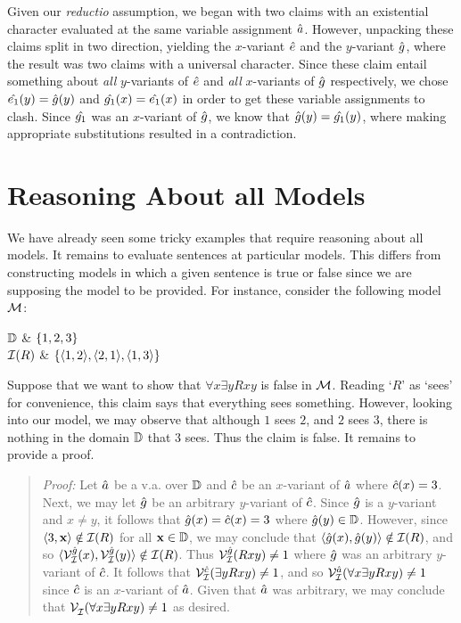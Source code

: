 Given our \textit{reductio} assumption, we began with two claims with an existential character evaluated at the same variable assignment $\hat{a}$.
However, unpacking these claims split in two direction, yielding the $x$-variant $\hat{e}$ and the $y$-variant $\hat{g}$, where the result was two claims with a universal character.
Since these claim entail something about \textit{all} $y$-variants of $\hat{e}$ and \textit{all} $x$-variants of $\hat{g}$ respectively, we chose $\hat{e_1}(y)=\hat{g}(y)$ and $\hat{g_1}(x)=\hat{e_1}(x)$ in order to get these variable assignments to clash. 
Since $\hat{g_1}$ was an $x$-variant of $\hat{g}$, we know that $\hat{g}(y)=\hat{g_1}(y)$, where making appropriate substitutions resulted in a contradiction.





\section{Reasoning About all Models}
  \label{sec.somemodelreasoning}

We have already seen some tricky examples that require reasoning about all models.
It remains to evaluate sentences at particular models.
This differs from constructing models in which a given sentence is true or false since we are supposing the model to be provided.
For instance, consider the following model $\mathcal{M}$:

\begin{partialmodel}
	$\mathbb{D}$			& $\lbrace1,2,3\rbrace$ \\
	$\mathcal{I}(R)$	  & $\lbrace\langle1,2\rangle,\langle2,1\rangle,\langle1,3\rangle\rbrace$ \\
\end{partialmodel}

Suppose that we want to show that $\forall x\exists y Rxy$ is false in $\mathcal{M}$.
Reading `$R$' as `sees' for convenience, this claim says that everything sees something.
However, looking into our model, we may observe that although $1$ sees $2$, and $2$ sees $3$, there is nothing in the domain $\mathbb{D}$ that $3$ sees.
Thus the claim is false.
It remains to provide a proof.

\begin{quote}
\label{somemodel1}
  \textit{Proof:}
  Let $\hat{a}$ be a v.a. over $\mathbb{D}$ and $\hat{c}$ be an $x$-variant of $\hat{a}$ where $\hat{c}(x)=3$.
  Next, we may let $\hat{g}$ be an arbitrary $y$-variant of $\hat{c}$.
  Since $\hat{g}$ is a $y$-variant and $x\neq y$, it follows that $\hat{g}(x)=\hat{c}(x)=3$ where $\hat{g}(y)\in\mathbb{D}$.
  However, since $\langle3,\mathbf{x}\rangle\notin\mathcal{I}(R)$ for all $\mathbf{x}\in\mathbb{D}$, we may conclude that $\langle\hat{g}(x),\hat{g}(y)\rangle\notin\mathcal{I}(R)$, and so $\langle\mathcal{V}_{\mathcal{I}}^{\hat{g}}(x),\mathcal{V}_{\mathcal{I}}^{\hat{g}}(y)\rangle\notin\mathcal{I}(R)$. 
  Thus $\mathcal{V}_{\mathcal{I}}^{\hat{g}}(Rxy)\neq 1$ where $\hat{g}$ was an arbitrary $y$-variant of $\hat{c}$.
  It follows that $\mathcal{V}_{\mathcal{I}}^{\hat{c}}(\exists yRxy)\neq 1$, and so $\mathcal{V}_{\mathcal{I}}^{\hat{a}}(\forall x\exists yRxy)\neq 1$ since $\hat{c}$ is an $x$-variant of $\hat{a}$.
  Given that $\hat{a}$ was arbitrary, we may conclude that $\mathcal{V}_{\mathcal{I}}^{}(\forall x\exists yRxy)\neq 1$ as desired. 
\end{quote}


